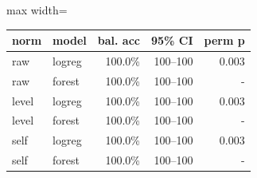 \begin{adjustbox}{max width=\textwidth}
{\footnotesize
\begin{tabular}{llrrr}
\toprule
\textbf{norm} & \textbf{model} & \textbf{bal. acc} & \textbf{95\% CI} & \textbf{perm p} \\
\midrule
raw & logreg & 100.0\% & 100--100 & 0.003 \\
raw & forest & 100.0\% & 100--100 & - \\
level & logreg & 100.0\% & 100--100 & 0.003 \\
level & forest & 100.0\% & 100--100 & - \\
self & logreg & 100.0\% & 100--100 & 0.003 \\
self & forest & 100.0\% & 100--100 & - \\
\bottomrule
\end{tabular}
}
\end{adjustbox}
